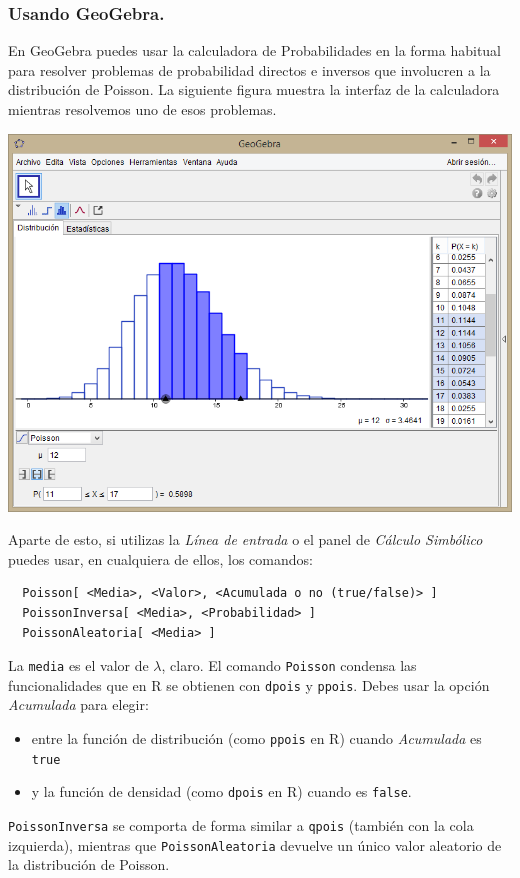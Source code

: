 \documentclass[10pt,a4paper]{article}\usepackage[]{graphicx}\usepackage[]{color}
\begin{document}
\subsubsection*{Usando GeoGebra.}

En GeoGebra puedes usar la calculadora de Probabilidades en la forma habitual para resolver problemas de probabilidad directos e inversos que involucren a la distribución de Poisson. La siguiente figura muestra la interfaz de la calculadora mientras resolvemos uno de esos problemas.

\begin{center}
    \includegraphics[width=15cm]{../fig/Tut08-02.png}
\end{center}

Aparte de esto, si utilizas la {\em Línea de entrada} o el panel de {\em Cálculo Simbólico} puedes usar, en cualquiera de ellos, los comandos:
\begin{verbatim}
  Poisson[ <Media>, <Valor>, <Acumulada o no (true/false)> ]
  PoissonInversa[ <Media>, <Probabilidad> ]
  PoissonAleatoria[ <Media> ]
\end{verbatim}
La {\tt media} es el valor de $\lambda$, claro. El comando {\tt Poisson} condensa las funcionalidades que en R se obtienen con {\tt dpois} y {\tt ppois}. Debes usar la opción {\em Acumulada} para elegir:
 \begin{itemize}
   \item entre la función de distribución (como {\tt ppois} en R) cuando {\em Acumulada} es {\tt true}
   \item y la función de densidad (como {\tt dpois} en R) cuando es {\tt false}.
 \end{itemize}
{\tt PoissonInversa} se comporta de forma similar a {\tt qpois} (también con la cola izquierda), mientras que {\tt PoissonAleatoria} devuelve un único valor aleatorio de la distribución de Poisson.
\end{document}
